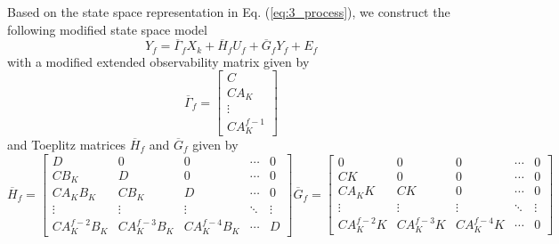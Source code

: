 Based on the state space representation in Eq. (\ref{eq:3_process}), we construct the following modified state space model
\begin{equation}\label{eq:3_modified_state_space_model}
Y_f = \overline{\Gamma}_f X_k + \overline{H}_f U_f + \overline{G}_f Y_f + E_f
\end{equation}
with a modified extended observability matrix given by
\begin{equation}\label{eq:3_updated_extended_observability}
\overline{\Gamma}_f = \begin{bmatrix}C\\ CA_K\\ \vdots\\ CA_K^{f-1}\end{bmatrix}
\end{equation}
and Toeplitz matrices $\overline{H}_f$ and $\overline{G}_f$ given by
\begin{subequations}\label{eq:3_updated_toeplitz}
\begin{equation}
\overline{H}_f = \begin{bmatrix}
D & 0 & 0 & \cdots & 0\\
CB_K & D & 0 & \cdots & 0\\
CA_KB_K & CB_K & D & \cdots & 0\\
\vdots & \vdots  & \vdots & \ddots & \vdots\\
CA_K^{f-2}B_K & CA_K^{f-3}B_K & CA_K^{f-4}B_K & \cdots & D
\end{bmatrix}
\end{equation}
\begin{equation}
\overline{G}_f = \begin{bmatrix}
0 & 0 & 0 & \cdots & 0\\
CK & 0 & 0 & \cdots & 0\\
CA_KK & CK & 0 & \cdots & 0\\
\vdots & \vdots  & \vdots & \ddots & \vdots\\
CA_K^{f-2}K & CA_K^{f-3}K & CA_K^{f-4}K & \cdots & 0
\end{bmatrix}
\end{equation}
\end{subequations}

